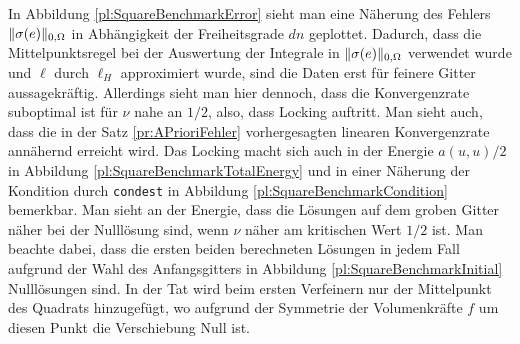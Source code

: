 \documentclass{scrartcl}
\DeclarePairedDelimiter{\norm}{\lVert}{\rVert}
\begin{document}
In Abbildung \ref{pl:SquareBenchmarkError} sieht man eine Näherung des Fehlers $\norm{\sigma(e)}_{0,\Omega}$ in Abhängigkeit der Freiheitsgrade $dn$ geplottet.
Dadurch, dass die Mittelpunktsregel bei der Auswertung der Integrale in $\norm{\sigma(e)}_{0,\Omega}$ verwendet wurde und $\ell$ durch $\ell_H$ approximiert wurde, sind die Daten erst für feinere Gitter aussagekräftig. Allerdings sieht man hier dennoch, dass die Konvergenzrate suboptimal ist für $\nu$ nahe an $1/2$, also, dass Locking auftritt. Man sieht auch, dass die in der Satz \ref{pr:APrioriFehler} vorhergesagten linearen Konvergenzrate annähernd erreicht wird.
Das Locking macht sich auch in der Energie $a(u,u)/2$ in Abbildung \ref{pl:SquareBenchmarkTotalEnergy} und in einer Näherung der Kondition durch \texttt{condest}
in Abbildung \ref{pl:SquareBenchmarkCondition} bemerkbar. Man sieht an der Energie, dass die Lösungen auf dem groben Gitter näher bei der Nulllösung sind, wenn $\nu$ näher am kritischen Wert $1/2$ ist.
Man beachte dabei, dass die ersten beiden berechneten Lösungen in jedem Fall aufgrund der Wahl des Anfangsgitters in Abbildung \ref{pl:SquareBenchmarkInitial} Nulllösungen sind. In der Tat wird beim ersten Verfeinern nur der Mittelpunkt des Quadrats hinzugefügt, wo aufgrund der Symmetrie der Volumenkräfte $f$ um diesen Punkt die Verschiebung Null ist.
\end{document}

